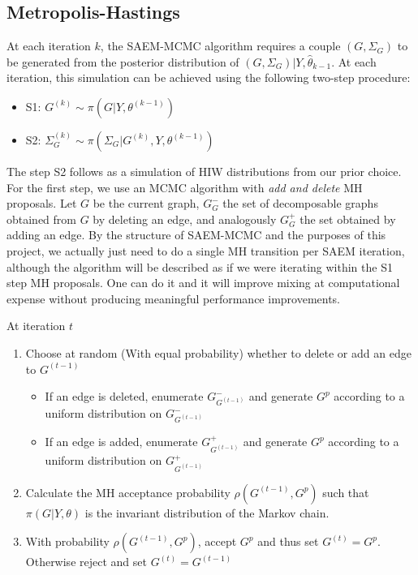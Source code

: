 \subsection{Metropolis-Hastings}\label{subsec:mh}
At each iteration $k$, the SAEM-MCMC algorithm requires a couple $(G , \Sigma_G)$ to be generated from the posterior distribution of $(G, \Sigma_G)| Y,\hat\theta_{k-1}$. At each iteration, this simulation can be achieved using the following two-step procedure:
\begin{itemize}
    \item S1: $G^{(k)} \sim \pi(G| Y,\theta^{(k-1)})$
    \item S2: $\Sigma_G^{(k)} \sim \pi(\Sigma_G | G^{(k)}, Y, \theta^{(k-1)})$
\end{itemize}
The step S2 follows as a simulation of HIW distributions from our prior choice. For the first step, we use an MCMC algorithm with \textit{add and delete} MH proposals. Let $G$ be the current graph, $G_{G}^{-}$ the set of decomposable graphs obtained from $G$ by deleting an edge, and analogously $G_{G}^{+}$ the set obtained by adding an edge. By the structure of SAEM-MCMC and the purposes of this project, we actually just need to do a single MH transition per SAEM iteration, although the algorithm will be described as if we were iterating within the S1 step MH proposals. One can do it and it will improve mixing at computational expense without producing meaningful performance improvements.
\begin{algorithm}[H]
    \caption{Add and delete MH proposal}\label{alg:add-delete-mh}
    At iteration $t$
    \begin{enumerate}
        \item Choose at random (With equal probability) whether to delete or add an edge to $G^{(t-1)}$
        \begin{itemize}
            \item If an edge is deleted, enumerate $G_{G^{(t-1)}}^{-}$ and generate $G^p$ according to a uniform distribution on $G_{G^{(t-1)}}^{-}$
            \item If an edge is added, enumerate $G_{G^{(t-1)}}^{+}$ and generate $G^p$ according to a uniform distribution on $G_{G^{(t-1)}}^{+}$
        \end{itemize}
        \item Calculate the MH acceptance probability $\rho(G^{(t-1)}, G^p)$ such that $\pi(G| Y, \theta)$ is the invariant distribution of the Markov chain.
        \item With probability $\rho(G^{(t-1)}, G^p)$, accept $G^p$ and thus set $G^{(t)} = G^p$. Otherwise reject and set $G^{(t)} = G^{(t-1)}$
    \end{enumerate}
\end{algorithm}
